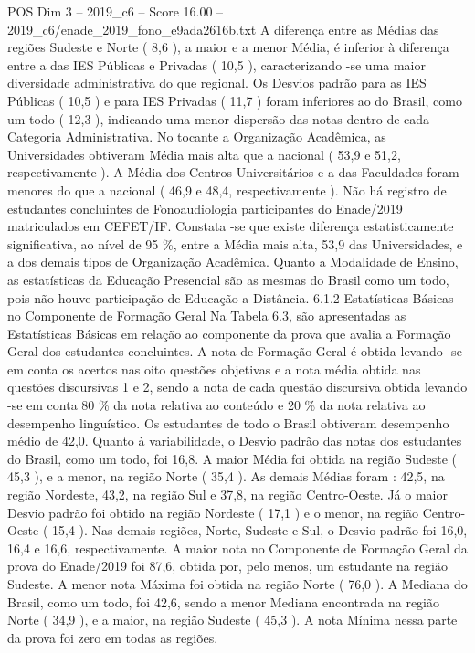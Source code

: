 \begin{textsample}{POS Dim 3 – 2019\_c6 – Score 16.00 – 2019\_c6/enade\_2019\_fono\_e9ada2616b.txt}
A diferença entre as Médias das regiões Sudeste e Norte ( 8,6 ), a maior e a menor Média, é inferior à diferença entre a das IES Públicas e Privadas ( 10,5 ), caracterizando -se uma maior diversidade administrativa do que regional.
Os Desvios padrão para as IES Públicas ( 10,5 ) e para IES Privadas ( 11,7 ) foram inferiores ao do Brasil, como um todo ( 12,3 ), indicando uma menor dispersão das notas dentro de cada Categoria Administrativa.
No tocante a Organização Acadêmica, as Universidades obtiveram Média mais alta que a nacional ( 53,9 e 51,2, respectivamente ).
A Média dos Centros Universitários e a das Faculdades foram menores do que a nacional ( 46,9 e 48,4, respectivamente ).
Não há registro de estudantes concluintes de Fonoaudiologia participantes do Enade/2019 matriculados em CEFET/IF.
Constata -se que existe diferença estatisticamente significativa, ao nível de 95 \%, entre a Média mais alta, 53,9 das Universidades, e a dos demais tipos de Organização Acadêmica.
Quanto a Modalidade de Ensino, as estatísticas da Educação Presencial são as mesmas do Brasil como um todo, pois não houve participação de Educação a Distância. 6.1.2 Estatísticas Básicas no Componente de Formação Geral Na Tabela 6.3, são apresentadas as Estatísticas Básicas em relação ao componente da prova que avalia a Formação Geral dos estudantes concluintes.
A nota de Formação Geral é obtida levando -se em conta os acertos nas oito questões objetivas e a nota média obtida nas questões discursivas 1 e 2, sendo a nota de cada questão discursiva obtida levando -se em conta 80 \% da nota relativa ao conteúdo e 20 \% da nota relativa ao desempenho linguístico.
Os estudantes de todo o Brasil obtiveram desempenho médio de 42,0.
Quanto à variabilidade, o Desvio padrão das notas dos estudantes do Brasil, como um todo, foi 16,8.
A maior Média foi obtida na região Sudeste ( 45,3 ), e a menor, na região Norte ( 35,4 ).
As demais Médias foram : 42,5, na região Nordeste, 43,2, na região Sul e 37,8, na região Centro-Oeste.
Já o maior Desvio padrão foi obtido na região Nordeste ( 17,1 ) e o menor, na região Centro-Oeste ( 15,4 ).
Nas demais regiões, Norte, Sudeste e Sul, o Desvio padrão foi 16,0, 16,4 e 16,6, respectivamente.
A maior nota no Componente de Formação Geral da prova do Enade/2019 foi 87,6, obtida por, pelo menos, um estudante na região Sudeste.
A menor nota Máxima foi obtida na região Norte ( 76,0 ).
A Mediana do Brasil, como um todo, foi 42,6, sendo a menor Mediana encontrada na região Norte ( 34,9 ), e a maior, na região Sudeste ( 45,3 ).
A nota Mínima nessa parte da prova foi zero em todas as regiões.

\end{textsample}
